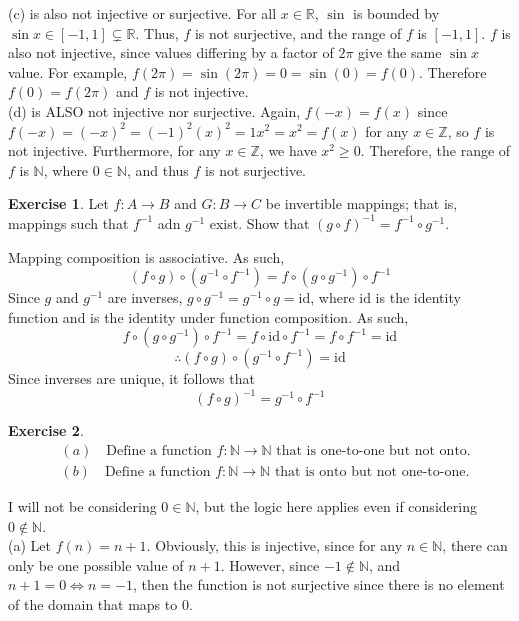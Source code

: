 \documentclass{article}
\theoremstyle{definition}
\newtheorem{environment}{Exercise}
\newenvironment{exercise}
    {\begin{mdframed}\begin{environment}}
    {\end{environment}\end{mdframed}}
\begin{document}
(c) is also not injective or surjective. For all \(x\in\mathbb{R} \), \(\sin \) is bounded by \(\sin x\in [-1,1] \subsetneq \mathbb{R} \). Thus, \(f\) is not surjective, and the range of \(f\) is \([-1,1]\). \(f\) is also not injective, since values differing by a factor of \(2\pi \) give the same \(\sin x\) value. For example, \(f(2\pi )=\sin (2\pi )=0=\sin (0)=f(0)\). Therefore \(f(0)=f(2\pi )\) and \(f\) is not injective.\\
(d) is ALSO not injective nor surjective. Again, \(f(-x)=f(x)\) since \(f(-x)=(-x)^2=(-1)^2(x)^2=1x^2=x^2=f(x)\) for any \(x\in\mathbb{Z} \), so \(f\) is not injective. Furthermore, for any \(x\in\mathbb{Z} \), we have \(x^2 \geq 0\). Therefore, the range of \(f\) is \(\mathbb{N}\), where \(0\in\mathbb{N} \), and thus \(f\) is not surjective.
\begin{exercise}
    Let \(f:A\to B\) and \(G:B\to C\) be invertible mappings; that is, mappings such that \(f^{-1} \) adn \(g^{-1} \) exist. Show that \((g\circ f)^{-1} =f^{-1} \circ g^{-1} \).
\end{exercise}	
Mapping composition is associative. As such,
\[
    (f\circ g)\circ\left( g^{-1} \circ f^{-1}\right) =f\circ \left( g\circ g^{-1}  \right) \circ f^{-1} 
\]
Since \(g\) and \(g^{-1} \) are inverses, \(g\circ g^{-1} =g^{-1} \circ g=\text{id} \), where \(\text{id} \) is the identity function and is the identity under function composition. As such,
\[
    f\circ \left( g\circ g^{-1}  \right) \circ f^{-1} =f\circ \text{id} \circ f^{-1} =f\circ f^{-1} =\text{id} 
\]
\[
    \therefore \left( f\circ g \right) \circ \left( g^{-1} \circ f^{-1}  \right) =\text{id} 
\]
Since inverses are unique, it follows that
\[
    \left( f\circ g \right) ^{-1} =g^{-1} \circ f^{-1} 
\]
\begin{exercise}
    \begin{align*}
        &(a)\quad\text{Define a function }f:\mathbb{N} \to \mathbb{N} \text{ that is one-to-one but not onto.}\\
        &(b)\quad\text{Define a function }f:\mathbb{N} \to \mathbb{N} \text{ that is onto but not one-to-one.}    
    \end{align*}
\end{exercise}
I will not be considering \(0\in\mathbb{N} \), but the logic here applies even if considering \(0\notin\mathbb{N} \).\\
(a) Let \(f(n)=n+1\). Obviously, this is injective, since for any \(n\in\mathbb{N} \), there can only be one possible value of \(n+1\). However, since \(-1\notin \mathbb{N} \), and \(n+1=0\iff n=-1\), then the function is not surjective since there is no element of the domain that maps to \(0\).\\
\end{document}
